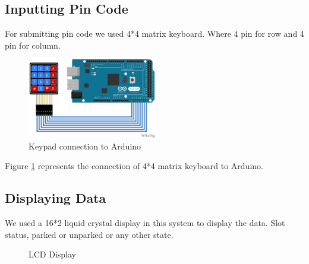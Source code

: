 \subsection{Inputting Pin Code}
For submitting pin code we used 4*4 matrix keyboard. Where 4 pin for row and 4 pin for column. 
\begin{figure}[H]
\centering
\includegraphics[width=0.5\textwidth]{figures/keybord_bb.png}
\caption{Keypad connection to Arduino}
\label{keyboard}
\end{figure}
Figure \ref{keyboard} represents the connection of 4*4 matrix keyboard to Arduino.

\subsection{Displaying Data}
We used a 16*2 liquid crystal display in this system to display the data. Slot status, parked or unparked or any other state.

\begin{figure}[H]
\centering
{} 
\hspace{1in}
\vspace{1cm}
\caption{LCD Display}
\end{figure}


